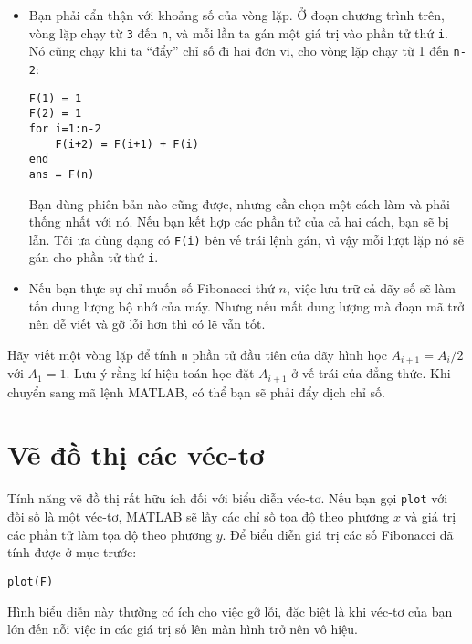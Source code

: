 \documentclass[12pt]{book}
\begin{document}
\begin{itemize}

\item Bạn phải cẩn thận với khoảng số của vòng lặp. Ở đoạn
chương trình trên, vòng lặp chạy từ {\tt 3} đến {\tt n},
và mỗi lần ta gán một giá trị vào phần tử thứ {\tt i}.
Nó cũng chạy khi ta ``đẩy'' chỉ số đi hai đơn vị, cho
vòng lặp chạy từ 1 đến {\tt n-2}:

\begin{verbatim}
F(1) = 1
F(2) = 1
for i=1:n-2
    F(i+2) = F(i+1) + F(i)
end
ans = F(n)
\end{verbatim}

Bạn dùng phiên bản nào cũng được, nhưng cần chọn một cách
làm và phải thống nhất với nó. Nếu bạn kết hợp các phần tử
của cả hai cách, bạn sẽ bị lẫn. Tôi ưa dùng dạng có {\tt F(i)}
bên vế trái lệnh gán, vì vậy mỗi lượt lặp nó sẽ gán cho phần
tử thứ {\tt i}.

\item Nếu bạn thực sự chỉ muốn số Fibonacci thứ $n$, việc 
lưu trữ cả dãy số sẽ làm tốn dung lượng bộ nhớ của máy. Nhưng
nếu mất dung lượng mà đoạn mã trở nên dễ viết và gỡ lỗi hơn
thì có lẽ vẫn tốt.

\end{itemize}

\begin{ex}
Hãy viết một vòng lặp để tính {\tt n} phần tử đầu tiên của
dãy hình học $A_{i+1} = A_i/2$ với $A_1 = 1$. Lưu ý rằng
kí hiệu toán học đặt $A_{i+1}$ ở vế trái của đẳng thức.
Khi chuyển sang mã lệnh MATLAB, có thể bạn sẽ phải đẩy dịch
chỉ số.
\end{ex}


\section{Vẽ đồ thị các véc-tơ}

Tính năng vẽ đồ thị rất hữu ích đối với biểu diễn véc-tơ. Nếu bạn
gọi {\tt plot} với đối số là một véc-tơ, MATLAB sẽ lấy các 
chỉ số tọa độ theo phương $x$ và giá trị các phần tử làm tọa độ
theo phương $y$. Để biểu diễn giá trị các số Fibonacci đã tính được ở
mục trước:

\begin{verbatim}
plot(F)
\end{verbatim}

Hình biểu diễn này thường có ích cho việc gỡ lỗi, đặc biệt là khi
véc-tơ của bạn lớn đến nỗi việc in các giá trị số lên màn hình
trở nên vô hiệu.
\end{document}
